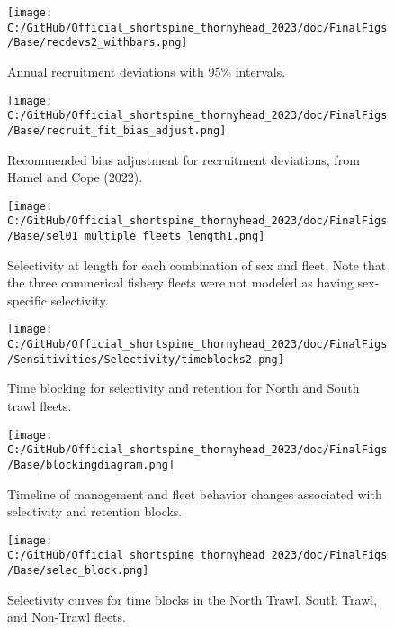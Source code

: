 \documentclass[11pt,
  letterpaper,
]{article}
\begin{document}
\begin{figure}
\centering
\texttt{[image: C:/GitHub/Official\_shortspine\_thornyhead\_2023/doc/FinalFigs/Base/recdevs2\_withbars.png]}
\caption{Annual recruitment deviations with 95\% intervals.\label{fig:recdevs}}
\end{figure}

\begin{figure}
\centering
\texttt{[image: C:/GitHub/Official\_shortspine\_thornyhead\_2023/doc/FinalFigs/Base/recruit\_fit\_bias\_adjust.png]}
\caption{Recommended bias adjustment for recruitment deviations, from Hamel and Cope (2022).\label{fig:recdevs_bias_adjust}}
\end{figure}

\begin{figure}
\centering
\texttt{[image: C:/GitHub/Official\_shortspine\_thornyhead\_2023/doc/FinalFigs/Base/sel01\_multiple\_fleets\_length1.png]}
\caption{Selectivity at length for each combination of sex and fleet. Note that the three commerical fishery fleets were not modeled as having sex-specific selectivity.\label{fig:selcurvs}}
\end{figure}

\begin{figure}
\centering
\texttt{[image: C:/GitHub/Official\_shortspine\_thornyhead\_2023/doc/FinalFigs/Sensitivities/Selectivity/timeblocks2.png]}
\caption{Time blocking for selectivity and retention for North and South trawl fleets.\label{fig:timeblocks}}
\end{figure}

\begin{figure}
\centering
\texttt{[image: C:/GitHub/Official\_shortspine\_thornyhead\_2023/doc/FinalFigs/Base/blockingdiagram.png]}
\caption{Timeline of management and fleet behavior changes associated with selectivity and retention blocks.\label{fig:diagram}}
\end{figure}

\begin{figure}
\centering
\texttt{[image: C:/GitHub/Official\_shortspine\_thornyhead\_2023/doc/FinalFigs/Base/selec\_block.png]}
\caption{Selectivity curves for time blocks in the North Trawl, South Trawl, and Non-Trawl fleets.\label{fig:selblocks}}
\end{figure}
\end{document}
